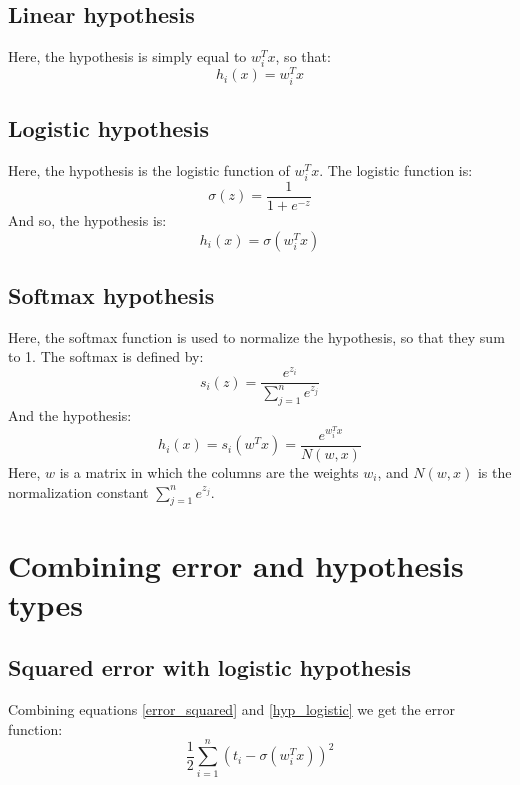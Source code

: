 \documentclass[12pt, a4paper]{article}
\numberwithin{equation}{section}
\begin{document}
\subsection{Linear hypothesis}
Here, the hypothesis is simply equal to $w_i^T x$, so that:
\begin{equation}
\label{hyp_linear}
h_i(x)=w_i^Tx
\end{equation}

\subsection{Logistic hypothesis}
Here, the hypothesis is the logistic function of $w_i^T x$. The logistic function is:
\begin{equation}
\sigma(z)=\frac{1}{1+e^{-z}}
\end{equation}
And so, the hypothesis is:
\begin{equation}
\label{hyp_logistic}
h_i(x)=\sigma(w_i^T x)
\end{equation}

\subsection{Softmax hypothesis}
Here, the softmax function is used to normalize the hypothesis, so that they sum to 1. The softmax is defined by:
\begin{equation}
s_i(z)=\frac{e^{z_i}}{\sum_{j=1}^n e^{z_j}}
\end{equation}
And the hypothesis:
\begin{equation}
\label{hyp_softmax}
h_i(x)=s_i(w^T x)=\frac{e^{w_i^T x}}{N(w,x)}
\end{equation}
Here, $w$ is a matrix in which the columns are the weights $w_i$, and $N(w,x)$ is the normalization constant $\sum_{j=1}^n e^{z_j}$.

\section{Combining error and hypothesis types}

\subsection{Squared error with logistic hypothesis}
Combining equations \ref{error_squared} and \ref{hyp_logistic} we get the error function:
\begin{equation}
\frac{1}{2}\sum_{i=1}^n(t_i-\sigma(w_i^T x))^2
\end{equation}
\end{document}
